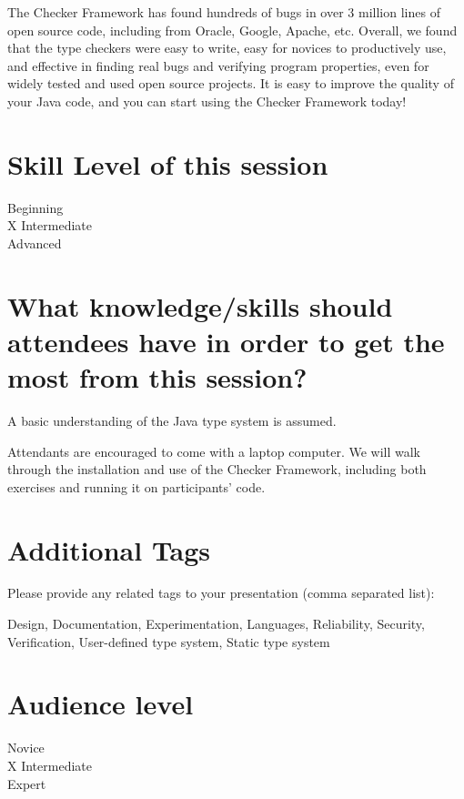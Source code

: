\documentclass{article}
\begin{document}
The Checker Framework has found hundreds of bugs in over 3 million lines of
open source code, including from Oracle, Google, Apache, etc.  Overall, we
found that the type checkers were easy to write, easy for novices to
productively use, and effective in finding real bugs and verifying program
properties, even for widely tested and used open source projects.  It is
easy to improve the quality of your Java code, and you can start using the
Checker Framework today!



\section{Skill Level of this session}

Beginning\\
X Intermediate\\
Advanced


\section{What knowledge/skills should attendees have in order to get
  the most from this session?}

A basic understanding of the Java type system is assumed.

Attendants are encouraged to come with a laptop computer.  We will walk
through the installation and use of the Checker Framework, including both
exercises and running it on participants' code.



\section{Additional Tags}

Please provide any related tags to your presentation 
(comma separated list):

\medskip

Design, Documentation, Experimentation, Languages, Reliability,
Security, Verification,
User-defined type system, Static type system


\section{Audience level}

Novice\\
X Intermediate\\
Expert

\medskip
\end{document}
